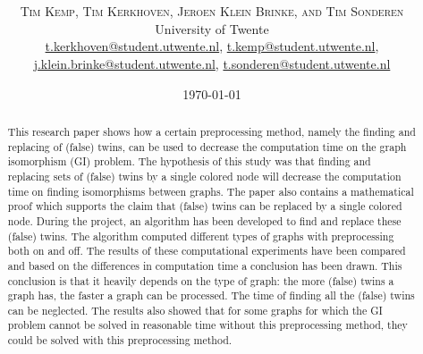 \documentclass[twoside]{article}
\title{\vspace{-15mm}\fontsize{24pt}{10pt}\selectfont\textbf{\articletitle}} %
\author{
\large
\textsc{Tim Kemp, Tim Kerkhoven, Jeroen Klein Brinke, and Tim Sonderen}\\[2mm] %
\normalsize University of Twente \\ %
\normalsize \href{mailto:t.kerkhoven@student.utwente.nl}{t.kerkhoven@student.utwente.nl}, 
\href{mailto:t.kemp@student.utwente.nl}{t.kemp@student.utwente.nl},\\ \normalsize
\href{mailto:j.klein.brinke@student.utwente.nl}{j.klein.brinke@student.utwente.nl}, \href{mailto:t.sonderen@student.utwente.nl}{t.sonderen@student.utwente.nl}%
}
\date{\today}
\theoremstyle{definition}
\theoremstyle{plain}
\begin{document}
\thispagestyle{empty}
\maketitle %


\begin{abstract}

This research paper shows how a certain preprocessing method, namely the finding and replacing of (false) twins, can be used to decrease the computation time on the graph isomorphism (GI) problem. The hypothesis of this study was that finding and replacing sets of (false) twins by a single colored node will decrease the computation time on finding isomorphisms between graphs. The paper also contains a mathematical proof which supports the claim that (false) twins can be replaced by a single colored node. During the project, an algorithm has been developed to find and replace these (false) twins.  The algorithm computed different types of graphs with preprocessing both on and off. The results of these computational experiments have been compared and based on the differences in computation time a conclusion has been drawn. This conclusion is that it heavily depends on the type of graph: the more (false) twins a graph has, the faster a graph can be processed. The time of finding all the (false) twins can be neglected. The results also showed that for some graphs for which the GI problem cannot be solved in reasonable time without this preprocessing method, they could be solved with this preprocessing method. 

\end{abstract}

\end{document}
